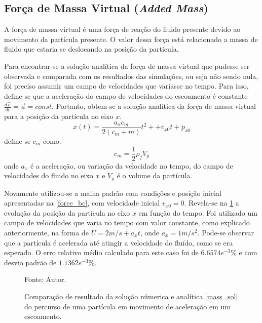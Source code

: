 \subsection{\textbf{Força de Massa Virtual (\textit{Added Mass})}}
\label{sec_mass}
A força de massa virtual é uma força de reação do fluido presente devido ao movimento da partícula presente.
O valor dessa força está relacionado a massa de fluido que estaria se deslocando na posição da partícula.

Para encontrar-se a solução analítica da força de massa virtual que pudesse ser observada e comparada com os resultados das simulações, ou seja não sendo nula, foi preciso assumir um campo de velocidades que variasse no tempo.
Para isso, define-se que a aceleração do campo de velocidades do escoamento é constante $\tfrac{d\vec{v}}{dt}=\vec{a}=const$.
Portanto, obtem-se a solução analítica da força de massa virtual para a posição da partícula no eixo $x$.
\begin{equation}
    x(t) = \dfrac{a_x c_m}{2(c_m + m)}t^2 + + v_{x0}t + p_{x0}
    \label{mass_sol} 
\end{equation}
define-se $c_m$ como:
\begin{equation}
    c_m = \dfrac{1}{2} \rho_f V_p
    \label{mass_c} 
\end{equation}
onde $a_x$ é a aceleração, ou variação da velocidade no tempo, do campo de velocidades do fluido no eixo $x$ e $V_p$ é o volume da partícula.

Novamente utilizou-se a malha padrão com condições e posição inicial apresentadas na \ref{force_bc}, com velocidade inicial $v_{x0}=0$.
Revela-se na \ref{mass_comp} a evolução da posição da partícula no eixo $x$ em função do tempo.
Foi utilizado um campo de velocidades que varia no tempo com valor constante, como explicado anteriormente, na forma de $U=2m/s+a_x t$, onde $a_x=1m/s^2$.
Pode-se observar que a partícula é acelerada até atingir a velocidade do fluído, como se era esperado.
O erro relativo médio calculado para este caso foi de $6.6574e^{-3}\%$ e com desvio padrão de $1.1362e^{-3}\%$.
\begin{figure}[H]
    \centering
     {\raggedleft \scriptsize Fonte: Autor.}
    \caption{Comparação de resultado da solução númerica e analítica \ref{mass_sol} do percurso de uma partícula em movimento de aceleração em um escoamento.}
    \label{mass_comp}
\end{figure}
